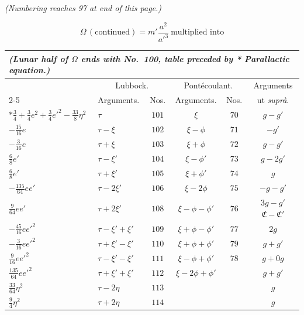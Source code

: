 \documentclass[12pt,a4paper]{article}
\theoremstyle{plain}
\begin{document}
\medskip
\noindent\hbox{}\hfill\textit{(Numbering reaches 97 at end of this page.)}

\newpage
{}
\[
\Omega\,(\text{continued})=m'\frac{a^{2}}{a'^{3}}\ \text{multiplied into}
\]

\begin{center}
\small
\begin{tabular}{|l|l|c|c|c|c|}
\hline
\multicolumn{6}{|l|}{\textit{(Lunar half of $\Omega$ ends with No.~100, table preceded by * Parallactic equation.)}} \\
\hline
& \multicolumn{2}{c|}{Lubbock.} & \multicolumn{2}{c|}{Pont\'ecoulant.} & Arguments \\
\cline{2-5}
& Arguments. & Nos. & Arguments. & Nos. & ut \textit{supr\`a}. \\
\hline
$*\tfrac{3}{4}+\tfrac{3}{4}e^{2}+\tfrac{3}{4}e'^{2}-\tfrac{33}{8}\eta^{2}$
                                           & $\tau$    & $101$ & $\xi$           & $70$ & $g-g'$ \\
$-\tfrac{15}{16}e$                          & $\tau-\xi$ & $102$ & $\xi-\phi$      & $71$ & $-g'$ \\
$-\tfrac{3}{16}e$                           & $\tau+\xi$ & $103$ & $\xi+\phi$      & $72$ & $g-g'$ \\
$\tfrac{6}{8}e'$                            & $\tau-\xi'$ & $104$ & $\xi-\phi'$    & $73$ & $g-2g'$ \\
$\tfrac{6}{8}e'$                            & $\tau+\xi'$ & $105$ & $\xi+\phi'$    & $74$ & $g$ \\
$-\tfrac{135}{64}e e'$                      & $\tau-2\xi'$ & $106$ & $\xi-2\phi$   & $75$ & $-g-g'$ \\
$\tfrac{9}{64}e e'$                         & $\tau+2\xi'$ & $108$ & $\xi-\phi-\phi'$ & $76$ & $3g-g'$ \quad $\mathfrak{C}-\mathfrak{C}'$ \\
$-\tfrac{45}{16}e e'^{2}$                   & $\tau-\xi'+\xi'$ & $109$ & $\xi+\phi-\phi'$ & $77$ & $2g$ \\
$-\tfrac{3}{16}e e'^{2}$                    & $\tau+\xi'-\xi'$ & $110$ & $\xi+\phi+\phi'$ & $79$ & $g+g'$ \\
$\tfrac{9}{16}e e'^{2}$                     & $\tau-\xi'-\xi'$ & $111$ & $\xi-\phi+\phi'$ & $78$ & $g+0g$ \\
$\tfrac{135}{64}e e'^{2}$                   & $\tau+\xi'+\xi'$ & $112$ & $\xi-2\phi+\phi'$ &      & $g+g'$ \\
$\tfrac{33}{64}\eta^{2}$                    & $\tau-2\eta$     & $113$ &                  &      & $g$ \\
$\tfrac{9}{4}\eta^{2}$                      & $\tau+2\eta$     & $114$ &                  &      & $g$ \\
\hline
\end{tabular}
\end{center}
\end{document}
